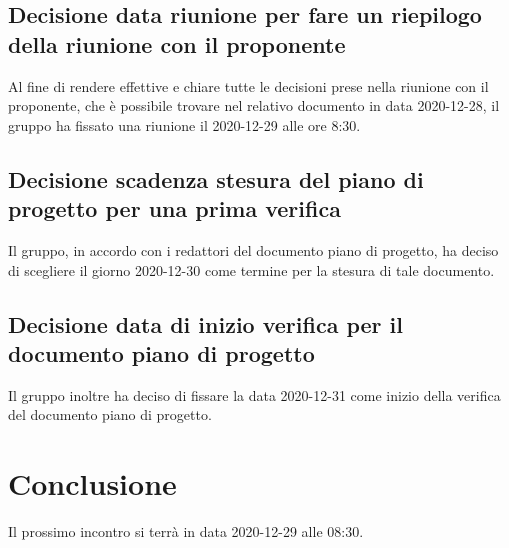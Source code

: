 \subsection{Decisione data riunione per fare un riepilogo della riunione con il proponente}
Al fine di rendere effettive e chiare tutte le decisioni prese nella riunione con il proponente, che è possibile trovare nel relativo documento in data 2020-12-28, il gruppo ha fissato una riunione il 2020-12-29 alle ore 8:30.

\subsection{Decisione scadenza stesura del piano di progetto per una prima verifica}
Il gruppo, in accordo con i redattori del documento piano di progetto, ha deciso di scegliere il giorno 2020-12-30 come termine per la stesura di tale documento.

\subsection{Decisione data di inizio verifica per il documento piano di progetto} 
Il gruppo inoltre ha deciso di fissare la data 2020-12-31 come inizio della verifica del documento piano di progetto.

\section{Conclusione}
Il prossimo incontro si terrà in data 2020-12-29 alle 08:30.
